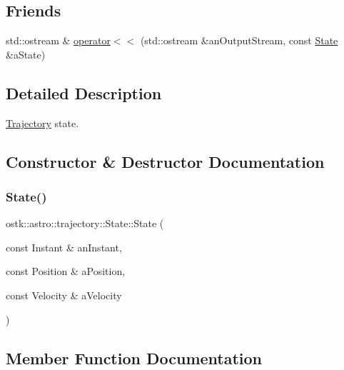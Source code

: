 \subsection*{Friends}
\begin{DoxyCompactItemize}
\item 
std\+::ostream \& \hyperlink{classostk_1_1astro_1_1trajectory_1_1_state_abba03f039f2534d691a1dc28426e8b89}{operator$<$$<$} (std\+::ostream \&an\+Output\+Stream, const \hyperlink{classostk_1_1astro_1_1trajectory_1_1_state}{State} \&a\+State)
\end{DoxyCompactItemize}


\subsection{Detailed Description}
\hyperlink{classostk_1_1astro_1_1_trajectory}{Trajectory} state. 

\subsection{Constructor \& Destructor Documentation}
\mbox{\label{classostk_1_1astro_1_1trajectory_1_1_state_a8628aceae903c9492f0fb269888434b0}} 
\subsubsection{\texorpdfstring{State()}{State()}}
{\footnotesize\ttfamily ostk\+::astro\+::trajectory\+::\+State\+::\+State (\begin{DoxyParamCaption}\item[{const Instant \&}]{an\+Instant,  }\item[{const Position \&}]{a\+Position,  }\item[{const Velocity \&}]{a\+Velocity }\end{DoxyParamCaption})}



\subsection{Member Function Documentation}
\mbox{\label{classostk_1_1astro_1_1trajectory_1_1_state_afc21870411eef52ce1293e31eda16d3c}} 
